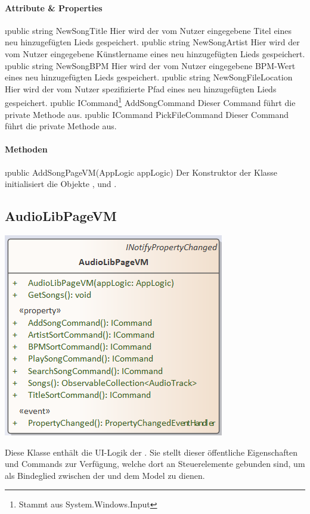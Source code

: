 \documentclass[../entwurf.tex]{subfiles}
\begin{document}
\paragraph{Attribute \& Properties}
\begin{itemize}
	\i{public string NewSongTitle} Hier wird der vom Nutzer eingegebene Titel eines neu hinzugefügten Lieds gespeichert.
	\i{public string NewSongArtist} Hier wird der vom Nutzer eingegebene Künstlername eines neu hinzugefügten Lieds gespeichert.
	\i{public string NewSongBPM} Hier wird der vom Nutzer eingegebene BPM-Wert eines neu hinzugefügten Lieds gespeichert.
	\i{public string NewSongFileLocation} Hier wird der vom Nutzer spezifizierte Pfad eines neu hinzugefügten Lieds gespeichert.
	\i{public ICommand\footnote{Stammt aus System.Windows.Input} AddSongCommand} Dieser Command führt die private Methode  aus. 
	\i{public ICommand PickFileCommand} Dieser Command führt die private Methode  aus. 
\end{itemize}
\paragraph{Methoden}
\begin{itemize}
	\i{public AddSongPageVM(AppLogic appLogic)} Der Konstruktor der Klasse initialisiert die Objekte ,  und .
\end{itemize}
\subsection{AudioLibPageVM}
\begin{minipage}{0.55\textwidth}
\includegraphics[scale=0.75]{../graphics/vm_klassen/AudioLibPageVM.png}
\end{minipage}
\begin{minipage}{0.45\textwidth}
Diese Klasse enthält die UI-Logik der . Sie stellt dieser öffentliche Eigenschaften und Commands zur Verfügung, welche dort an Steuerelemente gebunden sind, um als Bindeglied zwischen der  und dem Model zu dienen.
\end{minipage}
\end{document}
